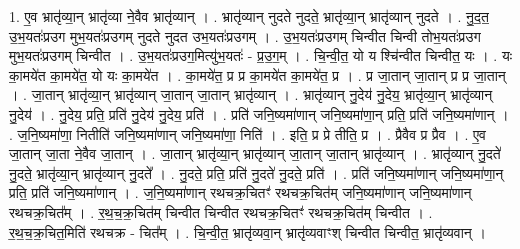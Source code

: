 \documentclass[17pt]{extarticle}
\begin{document}
1. ए॒व भ्रातृ॑व्या॒न् भ्रातृ॑व्या ने॒वैव भ्रातृ॑व्यान् । . भ्रातृ॑व्यान् नुदते नुदते॒ भ्रातृ॑व्या॒न् भ्रातृ॑व्यान् नुदते । . नु॒द॒त॒ उ॒भ॒यतः॑प्र‌उग मुभ॒यतः॑प्र‌उगम् नुदते नुदत उभ॒यतः॑प्र‌उगम् । . उ॒भ॒यतः॑प्र‌उगम् चिन्वीत चिन्वी तोभ॒यतः॑प्र‌उग मुभ॒यतः॑प्र‌उगम् चिन्वीत । . उ॒भ॒यतः॑प्र‌उग॒मित्यु॑भ॒यतः॑ - प्र॒उ॒ग॒म् । . चि॒न्वी॒त॒ यो य श्चि॑न्वीत चिन्वीत॒ यः । . यः का॒मये॑त का॒मये॑त॒ यो यः का॒मये॑त । . का॒मये॑त॒ प्र प्र का॒मये॑त का॒मये॑त॒ प्र । . प्र जा॒तान् जा॒तान् प्र प्र जा॒तान् । . जा॒तान् भ्रातृ॑व्या॒न् भ्रातृ॑व्यान् जा॒तान् जा॒तान् भ्रातृ॑व्यान् । . भ्रातृ॑व्यान् नु॒देय॑ नु॒देय॒ भ्रातृ॑व्या॒न् भ्रातृ॑व्यान् नु॒देय॑ । . नु॒देय॒ प्रति॒ प्रति॑ नु॒देय॑ नु॒देय॒ प्रति॑ । . प्रति॑ जनि॒ष्यमा॑णान् जनि॒ष्यमा॑णा॒न् प्रति॒ प्रति॑ जनि॒ष्यमा॑णान् । . ज॒नि॒ष्यमा॑णा॒ नितीति॑ जनि॒ष्यमा॑णान् जनि॒ष्यमा॑णा॒ निति॑ । . इति॒ प्र प्रे तीति॒ प्र । . प्रैवैव प्र प्रैव । . ए॒व जा॒तान् जा॒ता ने॒वैव जा॒तान् । . जा॒तान् भ्रातृ॑व्या॒न् भ्रातृ॑व्यान् जा॒तान् जा॒तान् भ्रातृ॑व्यान् । . भ्रातृ॑व्यान् नु॒दते॑ नु॒दते॒ भ्रातृ॑व्या॒न् भ्रातृ॑व्यान् नु॒दते᳚ । . नु॒दते॒ प्रति॒ प्रति॑ नु॒दते॑ नु॒दते॒ प्रति॑ । . प्रति॑ जनि॒ष्यमा॑णान् जनि॒ष्यमा॑णा॒न् प्रति॒ प्रति॑ जनि॒ष्यमा॑णान् । . ज॒नि॒ष्यमा॑णान् रथचक्र॒चितꣳ॑ रथचक्र॒चित॑म् जनि॒ष्यमा॑णान् जनि॒ष्यमा॑णान् रथचक्र॒चित᳚म् । . र॒थ॒च॒क्र॒चित॑म् चिन्वीत चिन्वीत रथचक्र॒चितꣳ॑ रथचक्र॒चित॑म् चिन्वीत । . र॒थ॒च॒क्र॒चित॒मिति॑ रथचक्र - चित᳚म् । . चि॒न्वी॒त॒ भ्रातृ॑व्यवा॒न् भ्रातृ॑व्यवाꣳश् चिन्वीत चिन्वीत॒ भ्रातृ॑व्यवान् । \newline
\end{document}
